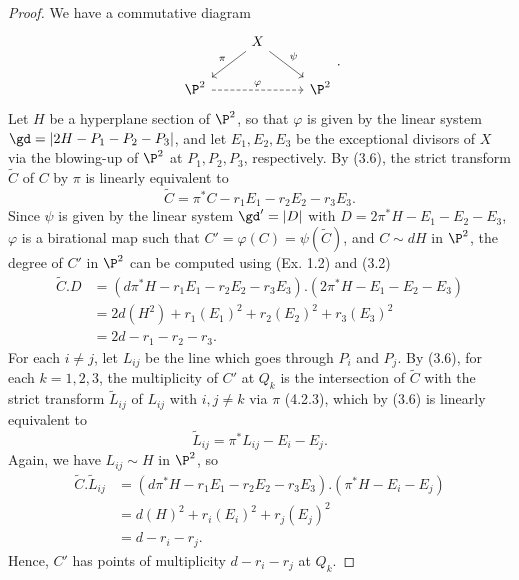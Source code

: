 \documentclass[a4paper]{article}
\begin{document}
\begin{enumerate} [label=\textbf{\arabic*.}, leftmargin=0em]
            \begin{proof}
                  We have a commutative diagram
                  \[ \begin{tikzcd}
                              & X \arrow[ld, "\pi"'] \arrow[rd, "\psi"] &      \\
                              \P^2 \arrow[rr, "\varphi", dashed] &                                          & \P^2
                        \end{tikzcd} . \]
                  Let $H$ be a hyperplane section of $\P^2$, so that $\varphi$ is given by the linear system $\gd = |2H - P_1 - P_2 - P_3|$, and let $E_1, E_2, E_3$ be the exceptional divisors of $X$ via the blowing-up of $\P^2$ at $P_1, P_2, P_3$, respectively.
                  By (3.6), the strict transform $\tilde{C}$ of $C$ by $\pi$ is linearly equivalent to
                  \begin{equation*}
                        \tilde{C} = \pi^*C - r_1E_1 - r_2 E_2 - r_3 E_3.
                  \end{equation*}
                  Since $\psi$ is given by the linear system $\gd' = |D|$ with $D = 2\pi^* H - E_1 - E_2 - E_3$, $\varphi$ is a birational map such that $C' = \varphi(C) = \psi(\tilde{C})$, and $C \sim dH$ in $\P^2$, the degree of $C'$ in $\P^2$ can be computed using (Ex. 1.2) and (3.2)
                  \begin{align*}
                        \tilde{C}.D & = (d\pi^*H - r_1E_1 - r_2E_2 - r_3 E_3). (2\pi^*H - E_1 - E_2 - E_3) \\
                                    & = 2d(H^2) + r_1 (E_1)^2 + r_2 (E_2)^2 + r_3(E_3)^2                   \\
                                    & = 2d - r_1 - r_2 - r_3.
                  \end{align*}
                  For each $i \neq j$, let $L_{ij}$ be the line which goes through $P_i$ and $P_j$.
                  By (3.6), for each $k = 1, 2, 3$, the multiplicity of $C'$ at $Q_k$ is the intersection of $\tilde{C}$ with the strict transform $\tilde{L}_{ij}$ of $L_{ij}$ with $i, j \neq k$ via $\pi$ (4.2.3), which by (3.6) is linearly equivalent to
                  \begin{equation*}
                        \tilde{L}_{ij} = \pi^*L_{ij} - E_i - E_j.
                  \end{equation*}
                  Again, we have $L_{ij} \sim H$ in $\P^2$, so
                  \begin{align*}
                        \tilde{C}.\tilde{L}_{ij} & = (d\pi^*H - r_1E_1 - r_2 E_2 - r_3E_3).(\pi^*H - E_i - E_j) \\
                                                 & = d(H)^2 + r_i (E_i)^2 + r_j (E_j)^2                         \\
                                                 & = d - r_i - r_j.
                  \end{align*}
                  Hence, $C'$ has points of multiplicity $d - r_i - r_j$ at $Q_k$.
            \end{proof}


\end{enumerate}
\end{document}
